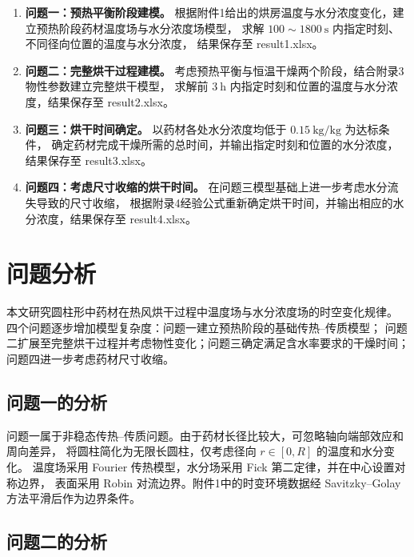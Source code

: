 \documentclass[12pt,a4paper]{ctexart}
\begin{document}
\begin{enumerate}
    \item \textbf{问题一：预热平衡阶段建模。}
    根据附件1给出的烘房温度与水分浓度变化，建立预热阶段药材温度场与水分浓度场模型，
    求解 $100\sim1800\ \mathrm{s}$ 内指定时刻、不同径向位置的温度与水分浓度，
    结果保存至 result1.xlsx。

    \item \textbf{问题二：完整烘干过程建模。}
    考虑预热平衡与恒温干燥两个阶段，结合附录3物性参数建立完整烘干模型，
    求解前 $3\ \mathrm{h}$ 内指定时刻和位置的温度与水分浓度，结果保存至 result2.xlsx。

    \item \textbf{问题三：烘干时间确定。}
    以药材各处水分浓度均低于 $0.15\ \mathrm{kg/kg}$ 为达标条件，
    确定药材完成干燥所需的总时间，并输出指定时刻和位置的水分浓度，结果保存至 result3.xlsx。

    \item \textbf{问题四：考虑尺寸收缩的烘干时间。}
    在问题三模型基础上进一步考虑水分流失导致的尺寸收缩，
    根据附录4经验公式重新确定烘干时间，并输出相应的水分浓度，结果保存至 result4.xlsx。
\end{enumerate}


\section{问题分析}

本文研究圆柱形中药材在热风烘干过程中温度场与水分浓度场的时空变化规律。
四个问题逐步增加模型复杂度：问题一建立预热阶段的基础传热--传质模型；
问题二扩展至完整烘干过程并考虑物性变化；问题三确定满足含水率要求的干燥时间；
问题四进一步考虑药材尺寸收缩。

\subsection{问题一的分析}

问题一属于非稳态传热--传质问题。由于药材长径比较大，可忽略轴向端部效应和周向差异，
将圆柱简化为无限长圆柱，仅考虑径向 $r\in[0,R]$ 的温度和水分变化。
温度场采用 Fourier 传热模型，水分场采用 Fick 第二定律，并在中心设置对称边界，
表面采用 Robin 对流边界。附件1中的时变环境数据经 Savitzky--Golay 方法平滑后作为边界条件。

\subsection{问题二的分析}
\end{document}

